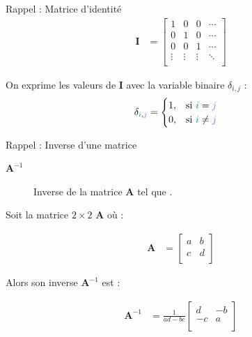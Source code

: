 \documentclass[french]{article}
\begin{document}
\begin{multicols*}{2}
\begin{rappel}{Rappel : Matrice d'identité}
\begin{align*}
	\bm{I}
	&=	\begin{bmatrix}
		1	&	0	&	0	&	\cdots	\\
		0	&	1	&	0	&	\cdots	\\
		0	&	0	&	1	&	\cdots	\\
		\vdots	&	\vdots	&	\vdots	&	\ddots	\\
	\end{bmatrix}
\end{align*}

\bigskip

On exprime les valeurs de $\bm{I}$ avec la variable binaire $\delta_{i, j}$ : 
\begin{align*}
	\delta_{\textcolor{teal}{i}, \textcolor{amethyst}{j}}
	&=	\begin{cases}
		1,	&	\text{si } \textcolor{teal}{i} = \textcolor{amethyst}{j}	\\
		0,	&	\text{si } \textcolor{teal}{i} \neq \textcolor{amethyst}{j}
		\end{cases}
\end{align*}
\end{rappel}

\begin{rappel}{Rappel : Inverse d'une matrice}
\begin{distributions}[Notation]
\begin{description}
	\item[$\bm{A}^{-1}$]	Inverse de la matrice $\bm{A}$ tel que .
\end{description}
\end{distributions}

Soit la matrice $2 \times 2$ $\bm{A}$ où : 

\begin{align*}
	\bm{A}
	&=	\begin{bmatrix}
		a	&	b	\\
		c	&	d	\\
		\end{bmatrix}
\end{align*}

\bigskip

Alors son inverse $\bm{A}^{-1}$ est : 

\begin{align*}
	\bm{A}^{-1}
	&=	\frac{1}{ad - bc} \begin{bmatrix}
		d	&	-b	\\
		-c	&	a	\\
		\end{bmatrix}
\end{align*}


\end{rappel}
\end{multicols*}
\end{document}
